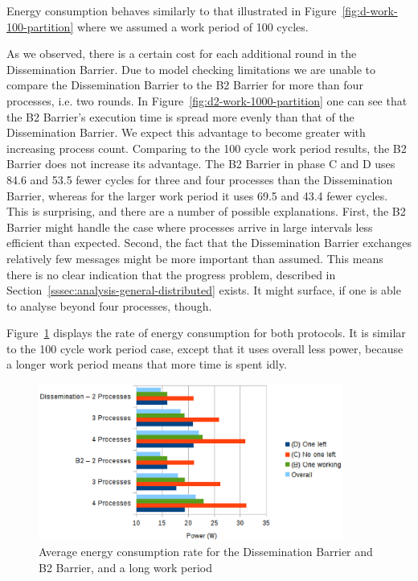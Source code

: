 \documentclass[a4paper, 10pt]{article}
\begin{document}
Energy consumption behaves similarly to that illustrated in Figure~\ref{fig:d-work-100-partition} where we assumed a work period of 100 cycles.

As we observed, there is a certain cost for each additional round in the Dissemination Barrier. Due to model checking limitations we are unable to compare the Dissemination Barrier to the B2 Barrier for more than four processes, i.e. two rounds. In Figure~\ref{fig:d2-work-1000-partition} one can see that the B2 Barrier's execution time is spread more evenly than that of the Dissemination Barrier. We expect this advantage to become greater with increasing process count.
Comparing to the 100 cycle work period results, the B2 Barrier does not increase its advantage. The B2 Barrier in phase C and D uses 84.6 and 53.5 fewer cycles for three and four processes than the Dissemination Barrier, whereas for the larger work period it uses 69.5 and 43.4 fewer cycles. This is surprising, and there are a number of possible explanations. First, the B2 Barrier might handle the case where processes arrive in large intervals less efficient than expected. Second, the fact that the Dissemination Barrier exchanges relatively few messages might be more important than assumed. This means there is no clear indication that the progress problem, described in Section~\ref{sssec:analysis-general-distributed} exists. It might surface, if one is able to analyse beyond four processes, though.

Figure~\ref{fig:d2-power-work-1000} displays the rate of energy consumption for both protocols. It is similar to the 100 cycle work period case, except that it uses overall less power, because a longer work period means that more time is spent idly.
\begin{figure}[htbp]
	\centering
	\includegraphics[width=10cm]{charts/d2-power-work-1000}
	\caption{Average energy consumption rate for the Dissemination Barrier and B2 Barrier, and a long work period}
	\label{fig:d2-power-work-1000}
\end{figure}
\end{document}
